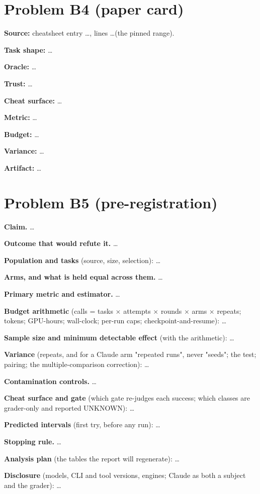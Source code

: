 \documentclass[11pt]{article}
\begin{document}
\section*{Problem B4 (paper card)}\label{ans:B4}
\begin{answer}
\textbf{Source:} cheatsheet entry \dots, lines \dots (the pinned range).

\textbf{Task shape:} \dots

\textbf{Oracle:} \dots

\textbf{Trust:} \dots

\textbf{Cheat surface:} \dots

\textbf{Metric:} \dots

\textbf{Budget:} \dots

\textbf{Variance:} \dots

\textbf{Artifact:} \dots
\end{answer}

\section*{Problem B5 (pre-registration)}\label{ans:B5}
\begin{answer}
\textbf{Claim.} \dots

\textbf{Outcome that would refute it.} \dots

\textbf{Population and tasks} (source, size, selection): \dots

\textbf{Arms, and what is held equal across them.} \dots

\textbf{Primary metric and estimator.} \dots

\textbf{Budget arithmetic} (calls = tasks $\times$ attempts $\times$ rounds
$\times$ arms $\times$ repeats; tokens; GPU-hours; wall-clock; per-run caps;
checkpoint-and-resume): \dots

\textbf{Sample size and minimum detectable effect} (with the arithmetic): \dots

\textbf{Variance} (repeats, and for a Claude arm "repeated runs", never
"seeds"; the test; pairing; the multiple-comparison correction): \dots

\textbf{Contamination controls.} \dots

\textbf{Cheat surface and gate} (which gate re-judges each success; which
classes are grader-only and reported UNKNOWN): \dots

\textbf{Predicted intervals} (first try, before any run): \dots

\textbf{Stopping rule.} \dots

\textbf{Analysis plan} (the tables the report will regenerate): \dots

\textbf{Disclosure} (models, CLI and tool versions, engines; Claude as both a
subject and the grader): \dots
\end{answer}
\end{document}
